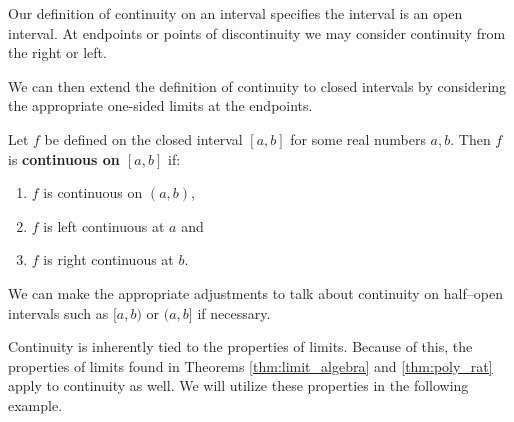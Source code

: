 Our definition of continuity on an interval specifies the interval is an open interval. At endpoints or points of discontinuity we may consider continuity from the right or left.


We can then extend the definition of continuity to closed intervals by considering the appropriate one-sided limits at the endpoints.

{Let $f$ be defined on the closed interval $[a,b]$ for some real numbers $a,b$. Then $f$ is \textbf{continuous on $[a,b]$} if:
\begin{enumerate}
	\item	$f$ is continuous on $(a,b)$,
	\item	$f$ is left continuous at $a$ and 
	\item	$f$ is right continuous at $b$.
\end{enumerate}}
		
We can make the appropriate adjustments to talk about continuity on half--open intervals such as $[a,b)$ or $(a,b]$ if necessary.\bigskip
%
%

Continuity is inherently tied to the properties of limits. Because of this, the properties of limits found in Theorems \ref{thm:limit_algebra} and \ref{thm:poly_rat}
apply to continuity as well. We will utilize these properties in the following example.

